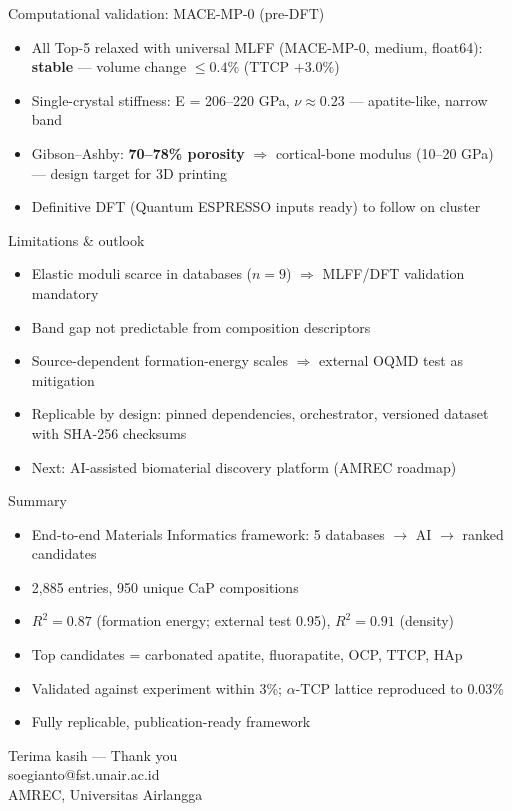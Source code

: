 \documentclass[10pt,aspectratio=169]{beamer}
\begin{document}
\begin{frame}{Computational validation: MACE-MP-0 (pre-DFT)}
\begin{itemize}
\item All Top-5 relaxed with universal MLFF (MACE-MP-0, medium, float64): \textbf{stable} --- volume change $\leq 0.4\%$ (TTCP $+3.0\%$)
\item Single-crystal stiffness: E = 206--220 GPa, $\nu \approx 0.23$ --- apatite-like, narrow band
\item Gibson--Ashby: \textbf{70--78\% porosity} $\Rightarrow$ cortical-bone modulus (10--20 GPa) --- design target for 3D printing
\item Definitive DFT (Quantum ESPRESSO inputs ready) to follow on cluster
\end{itemize}
\end{frame}

\begin{frame}{Limitations \& outlook}
\begin{itemize}
\item Elastic moduli scarce in databases ($n=9$) $\Rightarrow$ MLFF/DFT validation mandatory
\item Band gap not predictable from composition descriptors
\item Source-dependent formation-energy scales $\Rightarrow$ external OQMD test as mitigation
\item Replicable by design: pinned dependencies, orchestrator, versioned dataset with SHA-256 checksums
\item Next: AI-assisted biomaterial discovery platform (AMREC roadmap)
\end{itemize}
\end{frame}

\begin{frame}{Summary}
\begin{itemize}
\item End-to-end Materials Informatics framework: 5 databases $\rightarrow$ AI $\rightarrow$ ranked candidates
\item 2{,}885 entries, 950 unique CaP compositions
\item $R^2 = 0.87$ (formation energy; external test 0.95), $R^2 = 0.91$ (density)
\item Top candidates = carbonated apatite, fluorapatite, OCP, TTCP, HAp
\item Validated against experiment within 3\%; $\alpha$-TCP lattice reproduced to 0.03\%
\item Fully replicable, publication-ready framework
\end{itemize}
\end{frame}

\begin{frame}
\centering
\Large Terima kasih --- Thank you\\[4mm]
\normalsize soegianto@fst.unair.ac.id\\ AMREC, Universitas Airlangga
\end{frame}
\end{document}
